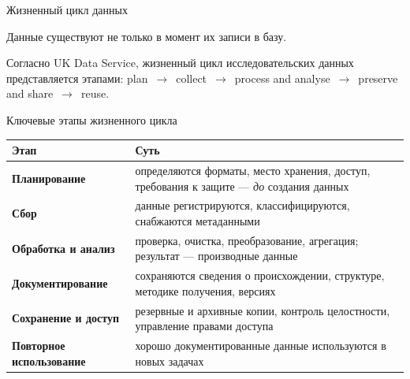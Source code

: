 \documentclass[aspectratio=169]{beamer}
\begin{document}
\begin{frame}{Жизненный цикл данных}

Данные существуют не только в момент их записи в базу.

\begin{center}
\end{center}

\footnotesize
\begin{center}
Согласно UK Data Service, жизненный цикл исследовательских
данных представляется этапами:
plan~$\rightarrow$~collect~$\rightarrow$~process and analyse~$\rightarrow$~preserve and share~$\rightarrow$~reuse.
\end{center}

\end{frame}


\begin{frame}{Ключевые этапы жизненного цикла}

\small
\begin{table}
\centering
\begin{tabular}{>{\bfseries}p{}|p{}}
\toprule
Этап & Суть\\
\midrule
Планирование &
определяются форматы, место хранения, доступ,
требования к защите — \textit{до} создания данных\\
Сбор &
данные регистрируются, классифицируются,
снабжаются метаданными\\
Обработка и анализ &
проверка, очистка, преобразование, агрегация;
результат — производные данные\\
Документирование &
сохраняются сведения о происхождении, структуре,
методике получения, версиях\\
Сохранение и доступ &
резервные и архивные копии, контроль целостности,
управление правами доступа\\
Повторное использование &
хорошо документированные данные используются
в новых задачах\\
\bottomrule
\end{tabular}
\end{table}

\end{frame}
\end{document}

